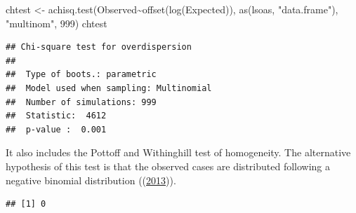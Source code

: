 \documentclass[
  krantz2]{krantz}
\makeatletter
\newenvironment{Shaded}{\begin{snugshade}}{\end{snugshade}}
\newcommand{\DecValTok}[1]{\textcolor[rgb]{0.06,0.06,0.06}{#1}}
\newcommand{\FunctionTok}[1]{\textcolor[rgb]{0,0,0}{#1}}
\newcommand{\NormalTok}[1]{#1}
\newcommand{\OtherTok}[1]{\textcolor[rgb]{0.37,0.37,0.37}{#1}}
\newcommand{\SpecialCharTok}[1]{\textcolor[rgb]{0,0,0}{#1}}
\newcommand{\StringTok}[1]{\textcolor[rgb]{0.5,0.5,0.5}{#1}}
\newenvironment{kframe}{%
\medskip{}
\setlength{\fboxsep}{.8em}
 \def\at@end@of@kframe{}%
 \ifinner\ifhmode%
  \def\at@end@of@kframe{\end{minipage}}%
  \begin{minipage}{\columnwidth}%
 \fi\fi%
 \def\FrameCommand##1{\hskip\@totalleftmargin \hskip-\fboxsep
 \colorbox{shadecolor}{##1}\hskip-\fboxsep
     \hskip-\linewidth \hskip-\@totalleftmargin \hskip\columnwidth}%
 \MakeFramed {\advance\hsize-\width
   \@totalleftmargin\z@ \linewidth\hsize
   \@setminipage}}%
 {\par\unskip\endMakeFramed%
 \at@end@of@kframe}
\renewenvironment{Shaded}{\begin{kframe}}{\end{kframe}}
\makeatother
\begin{document}
\begin{Shaded}
\begin{Highlighting}[]
\NormalTok{chtest }\OtherTok{\textless{}{-}} \FunctionTok{achisq.test}\NormalTok{(Observed}\SpecialCharTok{\textasciitilde{}}\FunctionTok{offset}\NormalTok{(}\FunctionTok{log}\NormalTok{(Expected)), }
                      \FunctionTok{as}\NormalTok{(lsoas, }\StringTok{"data.frame"}\NormalTok{), }
                      \StringTok{"multinom"}\NormalTok{, }
                      \DecValTok{999}\NormalTok{)}
\NormalTok{chtest}
\end{Highlighting}
\end{Shaded}

\begin{verbatim}
## Chi-square test for overdispersion 
## 
##  Type of boots.: parametric 
##  Model used when sampling: Multinomial 
##  Number of simulations: 999 
##  Statistic:  4612 
##  p-value :  0.001
\end{verbatim}

It also includes the Pottoff and Withinghill test of homogeneity. The alternative hypothesis of this test is that the observed cases are distributed following a negative binomial distribution ((\protect\hyperlink{ref-Bivand_2013}{2013})).

\begin{Shaded}
\end{Shaded}

\begin{verbatim}
## [1] 0
\end{verbatim}
\end{document}
